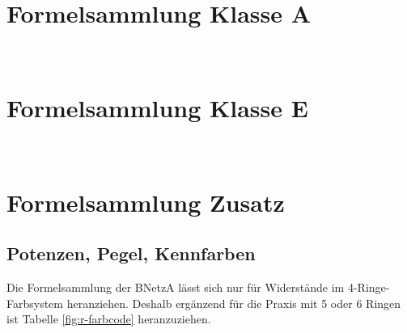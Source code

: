 
\chapter{Formelsammlung Klasse A}
    \label{att:formela}

    

%

\clearpage\newpage ~


\chapter{Formelsammlung Klasse E}
    \label{att:formele}

    

\clearpage\newpage ~


\chapter{Formelsammlung Zusatz}
    \label{att:formel+}

    \section*{Potenzen, Pegel, Kennfarben}

    Die Formelsammlung der BNetzA lässt sich nur für Widerstände im
    4-Ringe-Farbsystem heranziehen. Deshalb ergänzend für die Praxis mit 5 oder
    6 Ringen ist Tabelle \ref{fig:r-farbcode} heranzuziehen.

